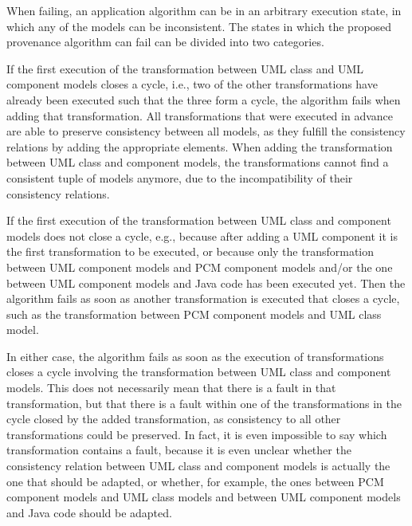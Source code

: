 When failing, an application algorithm can be in an arbitrary execution state, in which any of the models can be inconsistent.
The states in which the proposed provenance algorithm can fail can be divided into two categories.
\begin{longenumerate}
    \item If the first execution of the transformation between \gls{UML} class and \gls{UML} component models closes a cycle, i.e., two of the other transformations have already been executed such that the three form a cycle, the algorithm fails when adding that transformation.
    All transformations that were executed in advance are able to preserve consistency between all models, as they fulfill the consistency relations by adding the appropriate elements.
    When adding the transformation between \gls{UML} class and component models, the transformations cannot find a consistent tuple of models anymore, due to the incompatibility of their consistency relations.
    \item If the first execution of the transformation between \gls{UML} class and component models does not close a cycle, e.g., because after adding a \gls{UML} component it is the first transformation to be executed, or because only the transformation between \gls{UML} component models and \gls{PCM} component models and/or the one between \gls{UML} component models and Java code has been executed yet.
    Then the algorithm fails as soon as another transformation is executed that closes a cycle, such as the transformation between \gls{PCM} component models and \gls{UML} class model.
\end{longenumerate}
In either case, the algorithm fails as soon as the execution of transformations closes a cycle involving the transformation between \gls{UML} class and component models.
This does not necessarily mean that there is a fault in that transformation, but that there is a fault within one of the transformations in the cycle closed by the added transformation, as consistency to all other transformations could be preserved.
In fact, it is even impossible to say which transformation contains a fault, because it is even unclear whether the consistency relation between \gls{UML} class and component models is actually the one that should be adapted, or whether, for example, the ones between \gls{PCM} component models and \gls{UML} class models and between \gls{UML} component models and Java code should be adapted.

